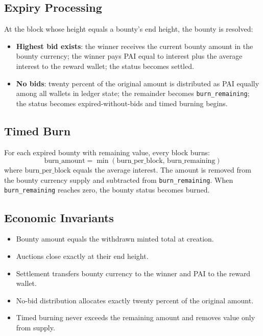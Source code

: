 \documentclass[11pt,a4paper]{article}
\begin{document}
\subsection{Expiry Processing}
At the block whose height equals a bounty's end height, the bounty is resolved:
\begin{itemize}
\item \textbf{Highest bid exists}: the winner receives the current bounty amount in the bounty currency; the winner pays PAI equal to interest plus the average interest to the reward wallet; the status becomes settled.
\item \textbf{No bids}: twenty percent of the original amount is distributed as PAI equally among all wallets in ledger state; the remainder becomes \texttt{burn\_remaining}; the status becomes expired-without-bids and timed burning begins.
\end{itemize}

\subsection{Timed Burn}
For each expired bounty with remaining value, every block burns:
\begin{equation}
\text{burn\_amount} = \min(\text{burn\_per\_block},\,\text{burn\_remaining})
\end{equation}
where $\text{burn\_per\_block}$ equals the average interest. The amount is removed from the bounty currency supply and subtracted from \texttt{burn\_remaining}. When \texttt{burn\_remaining} reaches zero, the bounty status becomes burned.

\subsection{Economic Invariants}
\begin{itemize}
\item Bounty amount equals the withdrawn minted total at creation.
\item Auctions close exactly at their end height.
\item Settlement transfers bounty currency to the winner and PAI to the reward wallet.
\item No-bid distribution allocates exactly twenty percent of the original amount.
\item Timed burning never exceeds the remaining amount and removes value only from supply.
\end{itemize}
\end{document}
